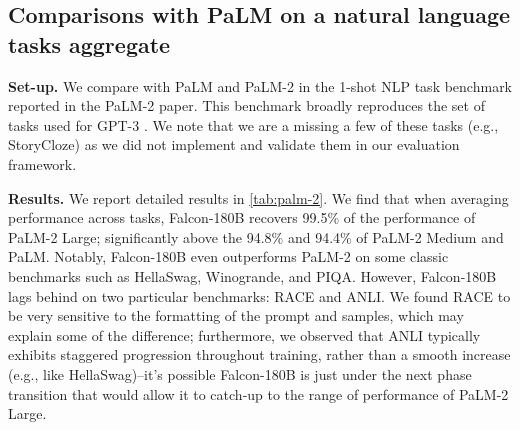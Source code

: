 \documentclass{article}
\begin{document}
\vspace{-0.1in}

\subsection{Comparisons with PaLM on a natural language tasks aggregate}
\label{sec:palm}

\textbf{Set-up.} We compare with PaLM \citep{palm} and PaLM-2 \citep{palm-2} in the 1-shot NLP task benchmark reported in the PaLM-2 paper. This benchmark broadly reproduces the set of tasks used for GPT-3 \citep{brown2020gpt3}. We note that we are a missing a few of these tasks (e.g., StoryCloze) as we did not implement and validate them in our evaluation framework.  

\textbf{Results.} We report detailed results in \cref{tab:palm-2}. We find that when averaging performance across tasks, Falcon-180B recovers 99.5\% of the performance of PaLM-2 Large; significantly above the 94.8\% and 94.4\% of PaLM-2 Medium and PaLM. Notably, Falcon-180B even outperforms PaLM-2 on some classic benchmarks such as HellaSwag, Winogrande, and PIQA. However, Falcon-180B lags behind on two particular benchmarks: RACE and ANLI. We found RACE to be very sensitive to the formatting of the prompt and samples, which may explain some of the difference; furthermore, we observed that ANLI typically exhibits staggered progression throughout training, rather than a smooth increase (e.g., like HellaSwag)--it's possible Falcon-180B is just under the next phase transition that would allow it to catch-up to the range of performance of PaLM-2 Large.
\end{document}
